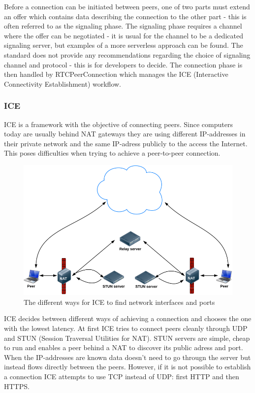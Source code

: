 Before a connection can be initiated between peers, one of two parts must extend an offer which contains data describing the connection to the other part - this is often referred to as the signaling phase. The signaling phase requires a channel where the offer can be negotiated - it is usual for the channel to be a dedicated signaling server, but examples of a more serverless approach can be found\cite{webrtcsignalserver}. The standard does not provide any recommendations regarding the choice of signaling channel and protocol - this is for developers to decide. The connection phase is then handled by RTCPeerConnection which manages the ICE (Interactive Connectivity Establishment) workflow.

\subsubsection{ICE}
ICE is a framework with the objective of connecting peers\cite{WebRTCBasics:2012:Online}. Since computers today are usually behind NAT gateways they are using different IP-addresses in their private network and the same IP-adress publicly to the access the Internet. This poses difficulties when trying to achieve a peer-to-peer connection.

\begin{figure}[htp]
\centering
\includegraphics[width=\textwidth,height=0.25\paperheight,keepaspectratio
]{figures/ICE}
\caption{The different ways for ICE to find network interfaces and ports \cite{WebRTCBasics:2012:Online}}
\label{fig:ICE}
\end{figure}

ICE decides between different ways of achieving a connection and chooses the one with the lowest latency\cite{WebRTCBasics:2012:Online}. At first ICE tries to connect peers cleanly through UDP and STUN (Session Traversal Utilities for NAT). STUN servers are simple, cheap to run and enables a peer behind a NAT to discover its public adress and port. When the IP-addresses are known data doesn't need to go througn the server but instead flows directly between the peers. However, if it is not possible to establish a connection ICE attempts to use TCP instead of UDP: first HTTP and then HTTPS.

